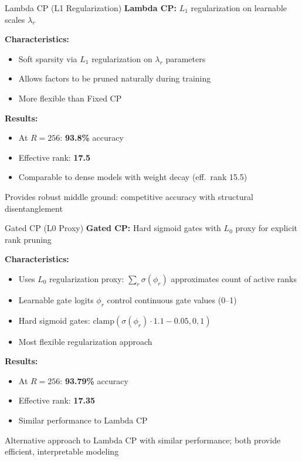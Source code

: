 \begin{frame}{Lambda CP (L1 Regularization)}
    \textbf{Lambda CP:} $L_1$ regularization on learnable scales $\lambda_r$
    
    \vspace{0.5cm}
    \textbf{Characteristics:}
    \begin{itemize}
        \item Soft sparsity via $L_1$ regularization on $\lambda_r$ parameters
        \item Allows factors to be pruned naturally during training
        \item More flexible than Fixed CP
    \end{itemize}
    
    \vspace{0.5cm}
    \textbf{Results:}
    \begin{itemize}
        \item At $R=256$: \textbf{93.8\%} accuracy
        \item Effective rank: \textbf{17.5}
        \item Comparable to dense models with weight decay (eff.\ rank 15.5)
    \end{itemize}
    
    \vspace{0.3cm}
    \small
    Provides robust middle ground: competitive accuracy with structural disentanglement
\end{frame}

\begin{frame}{Gated CP (L0 Proxy)}
    \textbf{Gated CP:} Hard sigmoid gates with $L_0$ proxy for explicit rank pruning
    
    \vspace{0.5cm}
    \textbf{Characteristics:}
    \begin{itemize}
        \item Uses $L_0$ regularization proxy: $\sum_r \sigma(\phi_r)$ approximates count of active ranks
        \item Learnable gate logits $\phi_r$ control continuous gate values (0--1)
        \item Hard sigmoid gates: $\text{clamp}(\sigma(\phi_r) \cdot 1.1 - 0.05, 0, 1)$
        \item Most flexible regularization approach
    \end{itemize}
    
    \vspace{0.5cm}
    \textbf{Results:}
    \begin{itemize}
        \item At $R=256$: \textbf{93.79\%} accuracy
        \item Effective rank: \textbf{17.35}
        \item Similar performance to Lambda CP
    \end{itemize}
    
    \vspace{0.3cm}
    \small
    Alternative approach to Lambda CP with similar performance; both provide efficient, interpretable modeling
\end{frame}
